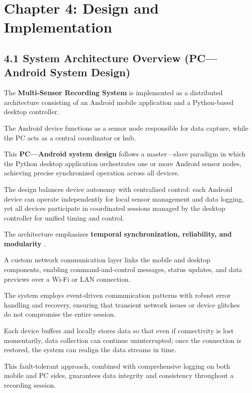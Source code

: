 \label{chap:4} \chapter{Chapter 4: Design and Implementation}

 \section{4.1 System Architecture Overview (PC---Android System Design)}

The \textbf{Multi-Sensor Recording System}
 is implemented as a distributed architecture consisting of an Android mobile application and a Python-based desktop controller.

The Android device functions as a sensor node responsible for data capture, while the PC acts as a central coordinator or hub.

This \textbf{PC---Android system design}
 follows a master---slave paradigm in which the Python desktop application orchestrates one or more Android sensor nodes, achieving precise synchronized operation across all devices.

The design balances device autonomy with centralized control: each Android device can operate independently for local sensor management and data logging, yet all devices participate in coordinated sessions managed by the desktop controller for unified timing and control.

The architecture emphasizes \textbf{temporal synchronization, reliability, and modularity}
.

A custom network communication layer links the mobile and desktop components, enabling command-and-control messages, status updates, and data previews over a Wi-Fi or LAN connection.

The system employs event-driven communication patterns with robust error handling and recovery, ensuring that transient network issues or device glitches do not compromise the entire session.

Each device buffers and locally stores data so that even if connectivity is lost momentarily, data collection can continue uninterrupted; once the connection is restored, the system can realign the data streams in time.

This fault-tolerant approach, combined with comprehensive logging on both mobile and PC sides, guarantees data integrity and consistency throughout a recording session.

